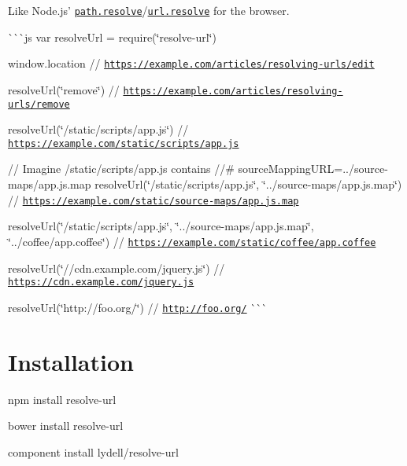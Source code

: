 \href{https://ci.testling.com/lydell/resolve-url}{\tt }

Like Node.\+js’ \href{http://nodejs.org/api/path.html#path_path_resolve_from_to}{\tt {\ttfamily path.\+resolve}}/\href{http://nodejs.org/api/url.html#url_url_resolve_from_to}{\tt {\ttfamily url.\+resolve}} for the browser.

\`{}\`{}\`{}js var resolve\+Url = require(\char`\"{}resolve-\/url\char`\"{})

window.\+location // \href{https://example.com/articles/resolving-urls/edit}{\tt https\+://example.\+com/articles/resolving-\/urls/edit}

resolve\+Url(\char`\"{}remove\char`\"{}) // \href{https://example.com/articles/resolving-urls/remove}{\tt https\+://example.\+com/articles/resolving-\/urls/remove}

resolve\+Url(\char`\"{}/static/scripts/app.\+js\char`\"{}) // \href{https://example.com/static/scripts/app.js}{\tt https\+://example.\+com/static/scripts/app.\+js}

// Imagine /static/scripts/app.js contains {\ttfamily //\# source\+Mapping\+U\+RL=../source-\/maps/app.js.\+map} resolve\+Url(\char`\"{}/static/scripts/app.\+js\char`\"{}, \char`\"{}../source-\/maps/app.\+js.\+map\char`\"{}) // \href{https://example.com/static/source-maps/app.js.map}{\tt https\+://example.\+com/static/source-\/maps/app.\+js.\+map}

resolve\+Url(\char`\"{}/static/scripts/app.\+js\char`\"{}, \char`\"{}../source-\/maps/app.\+js.\+map\char`\"{}, \char`\"{}../coffee/app.\+coffee\char`\"{}) // \href{https://example.com/static/coffee/app.coffee}{\tt https\+://example.\+com/static/coffee/app.\+coffee}

resolve\+Url(\char`\"{}//cdn.\+example.\+com/jquery.\+js\char`\"{}) // \href{https://cdn.example.com/jquery.js}{\tt https\+://cdn.\+example.\+com/jquery.\+js}

resolve\+Url(\char`\"{}http\+://foo.\+org/\char`\"{}) // \href{http://foo.org/}{\tt http\+://foo.\+org/} \`{}\`{}\`{}

\section*{Installation }


\begin{DoxyItemize}
\item {\ttfamily npm install resolve-\/url}
\item {\ttfamily bower install resolve-\/url}
\item {\ttfamily component install lydell/resolve-\/url}
\end{DoxyItemize}

